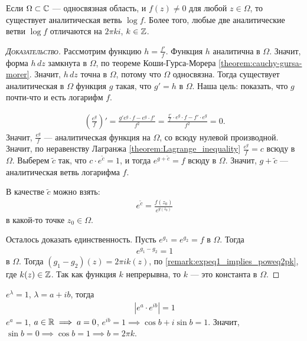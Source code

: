 \documentclass[../complex-analysis.tex]{subfiles}
\begin{document}
\begin{thm}[%
]
 Если $ \Omega \subset \mathbb{C} $ --- односвязная область, и $ f(z) \neq 0 $ для любой $ z \in \Omega $, то существует аналитическая ветвь $ \log f $. Более того, любые две аналитические ветви $ \log f $ отличаются на $ 2\pi k i $, $ k \in \mathbb{Z} $.
\end{thm}
\begin{proof}[\normalfont\textsc{Доказательство}]
 Рассмотрим функцию $h = \frac{f'}{f}$. Функция $ h $ аналитична в $ \Omega $. Значит, форма  $ h\,dz $ замкнута в  $ \Omega $, по теореме Коши-Гурса-Морера \eqref{theorem:cauchy-gursa-morer}. Значит, $ h\,dz $ точна в  $ \Omega $, потому что  $ \Omega $  односвязна. Тогда существует аналитическая в $ \Omega $  функция $ g $  такая, что $ g' = h $ в  $ \Omega $. Наша цель: показать, что $ g $  почти-что и есть логарифм $ f $.

 \begin{align*}
  \left( \frac{e^{g}}{f} \right)' = \frac{g' e^{g} \cdot f - e^{g} \cdot f'}{f^{2}} = \frac{\frac{f'}{f} \cdot e^{g} \cdot f - f' \cdot e^{g}}{f^{2}} = 0.
\end{align*} Значит, $ \frac{e^{g}}{f} $  --- аналитическая функция на $ \Omega $, со всюду нулевой производной. Значит, по неравенству Лагранжа \eqref{theorem:Lagrange_inequality} $ \frac{e^{g}}{f} = c $ всюду в $ \Omega $. Выберем $ \tilde c $ так, что $ c \cdot e^{\tilde c} = 1 $, и тогда $ e^{g+\tilde c} = f $ всюду в $ \Omega $. Значит, $ g + \tilde c $ --- аналитическая ветвь логарифма $ f $.

В качестве $\tilde c$ можно взять: 
 \begin{align*}
  e^{\tilde c} = \frac{ f(z_0)}{e^{g(z_0)}}
 \end{align*} в какой-то точке $ z_0 \in \Omega $.

 Осталось доказать единственность. Пусть $ e^{g_1} = e^{g_2} = f $ в $ \Omega $. Тогда
 \begin{align*}
  e^{g_1 - g_2} = 1
\end{align*} в $ \Omega $. Тогда $ (g_1-g_2)(z) = 2\pi i k (z) $, по \eqref{remark:expeq1_implies_poweq2pk}, где $ k(z) \in \mathbb{Z}$. Так как функция $k$ непрерывна, то $ k $ --- это константа в $ \Omega $.

\end{proof}
\begin{remrk}
  \label{remark:expeq1_implies_poweq2pk}
 $ e^{\lambda} = 1 $, $ \lambda = a + ib $, тогда
 \begin{align*}
  \left|e^{a} \cdot e^{ib} \right| = 1
 \end{align*} $ e^{a} = 1 $, $ a \in \mathbb{R} \implies a = 0 $, $ e^{ib} = 1 \implies \cos b + i \sin b = 1$. Значит, $ \sin b = 0 \implies \cos b = 1 \implies b = 2\pi k $.
\end{remrk}
\end{document}
